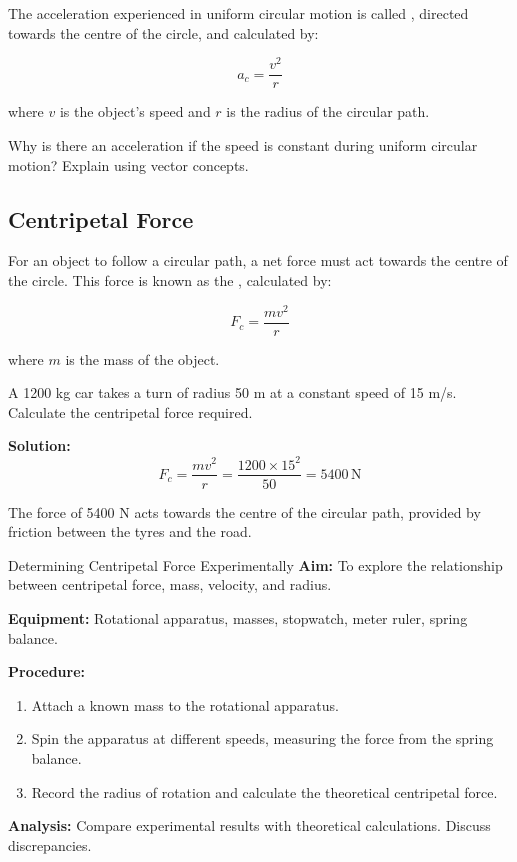 The acceleration experienced in uniform circular motion is called , directed towards the centre of the circle, and calculated by:

\[
a_c = \frac{v^2}{r}
\]

where \( v \) is the object's speed and \( r \) is the radius of the circular path.

\begin{stopandthink}
Why is there an acceleration if the speed is constant during uniform circular motion? Explain using vector concepts.
\end{stopandthink}

\subsection{Centripetal Force}
\FloatBarrier

For an object to follow a circular path, a net force must act towards the centre of the circle. This force is known as the , calculated by:

\[
F_c = \frac{mv^2}{r}
\]

where \( m \) is the mass of the object.

\begin{example}
A 1200 kg car takes a turn of radius 50 m at a constant speed of 15 m/s. Calculate the centripetal force required.

\textbf{Solution:}
\[
F_c = \frac{mv^2}{r} = \frac{1200 \times 15^2}{50} = 5400\,\text{N}
\]

The force of 5400 N acts towards the centre of the circular path, provided by friction between the tyres and the road.
\end{example}

\begin{investigation}{Determining Centripetal Force Experimentally}
\textbf{Aim:} To explore the relationship between centripetal force, mass, velocity, and radius.

\textbf{Equipment:} Rotational apparatus, masses, stopwatch, meter ruler, spring balance.

\textbf{Procedure:}
\begin{enumerate}
  \item Attach a known mass to the rotational apparatus.
  \item Spin the apparatus at different speeds, measuring the force from the spring balance.
  \item Record the radius of rotation and calculate the theoretical centripetal force.
\end{enumerate}

\textbf{Analysis:} Compare experimental results with theoretical calculations. Discuss discrepancies.
\end{investigation}

